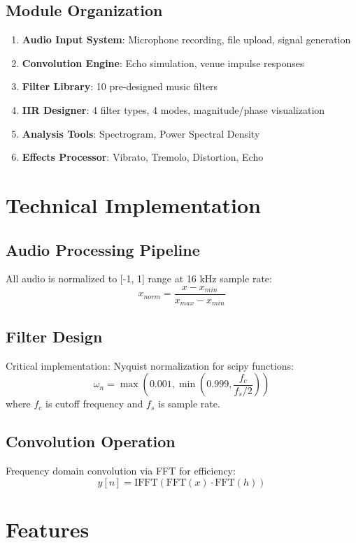 \documentclass[twocolumn]{article}
\begin{document}
\subsection{Module Organization}
\begin{enumerate}
    \item \textbf{Audio Input System}: Microphone recording, file upload, signal generation
    \item \textbf{Convolution Engine}: Echo simulation, venue impulse responses
    \item \textbf{Filter Library}: 10 pre-designed music filters
    \item \textbf{IIR Designer}: 4 filter types, 4 modes, magnitude/phase visualization
    \item \textbf{Analysis Tools}: Spectrogram, Power Spectral Density
    \item \textbf{Effects Processor}: Vibrato, Tremolo, Distortion, Echo
\end{enumerate}

\section{Technical Implementation}

\subsection{Audio Processing Pipeline}
All audio is normalized to [-1, 1] range at 16 kHz sample rate:
\[
x_{norm} = \frac{x - x_{min}}{x_{max} - x_{min}}
\]

\subsection{Filter Design}
Critical implementation: Nyquist normalization for scipy functions:
\[
\omega_n = \max(0.001, \min(0.999, \frac{f_c}{f_s/2}))
\]
where $f_c$ is cutoff frequency and $f_s$ is sample rate.

\subsection{Convolution Operation}
Frequency domain convolution via FFT for efficiency:
\[
y[n] = \text{IFFT}(\text{FFT}(x) \cdot \text{FFT}(h))
\]

\section{Features}
\end{document}
